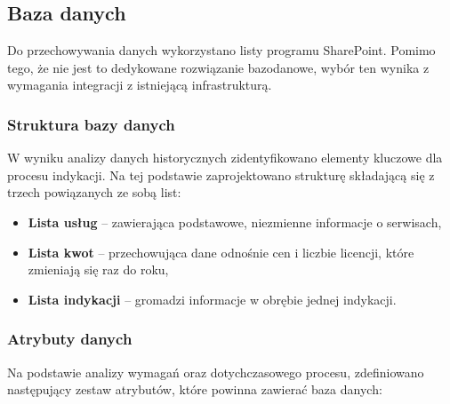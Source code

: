 \subsection{Baza danych}

Do przechowywania danych wykorzystano listy programu SharePoint. Pomimo tego, że nie jest to dedykowane rozwiązanie bazodanowe, wybór ten wynika z wymagania integracji z istniejącą infrastrukturą.

\subsubsection*{Struktura bazy danych}
\label{Subsec: StrukturaBazyDanych}
W wyniku analizy danych historycznych zidentyfikowano elementy kluczowe dla procesu indykacji. Na tej podstawie zaprojektowano strukturę składającą się z trzech powiązanych ze sobą list:

\begin{itemize}
  \item \textbf{Lista usług} -- zawierająca podstawowe, niezmienne informacje o serwisach,
  \item \textbf{Lista kwot} -- przechowująca dane odnośnie cen i liczbie licencji, które zmieniają się raz do roku,
  \item \textbf{Lista indykacji} -- gromadzi informacje w obrębie jednej indykacji.
\end{itemize}
\subsubsection*{Atrybuty danych}
Na podstawie analizy wymagań oraz dotychczasowego procesu, zdefiniowano następujący zestaw atrybutów, które powinna zawierać baza danych:

